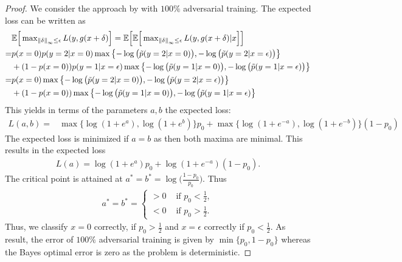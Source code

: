 \begin{proof}
    We consider the approach by \cite{MadryICLR2018} with $100\%$ adversarial training. The expected loss can be written as
	\begin{align*}
		&\mathbb{E}\Big[\mathop{\rm max}\nolimits_{\left\|\delta\right\|_\infty\leq \epsilon} L(y,g(x+\delta)\Big]= \mathbb{E}\Big[\mathbb{E}\Big[\mathop{\rm max}\nolimits_{\left\|\delta\right\|_\infty\leq \epsilon} L(y,g(x+\delta)|x\Big]\Big]\\
		=&p(x=0)p(y=2|x=0)\mathop{\rm max}\nolimits\left\{-\log\big(\tilde{p}(y=2|x=0)\big),-\log\big(\tilde{p}(y=2|x=\epsilon)\big)\right\}\\
		&+(1-p(x=0))p(y=1|x=\epsilon)\mathop{\rm max}\nolimits\left\{-\log\big(\tilde{p}(y=1|x=0)\big),-\log\big(\tilde{p}(y=1|x=\epsilon)\big)\right\}\\
		=&p(x=0)\mathop{\rm max}\nolimits\left\{-\log\big(\tilde{p}(y=2|x=0)\big),-\log\big(\tilde{p}(y=2|x=\epsilon)\big)\right\}\\
	 	&+ (1-p(x=0))\mathop{\rm max}\nolimits\left\{-\log\big(\tilde{p}(y=1|x=0)\big),-\log\big(\tilde{p}(y=1|x=\epsilon)\right\}
	\end{align*}
	This yields in terms of the parameters $a,b$ the expected loss:
    \begin{align*}
    	L(a,b)=&  \max\Big\{ \log(1+e^a),\log(1+e^b)\Big\}p_0 + \max\Big\{ \log(1+e^{-a}),\log(1+e^{-b})\Big\}(1-p_0)
    \end{align*}
   	The expected loss is minimized if $a=b$ as then both maxima are minimal. This results in the expected loss
   	\begin{align*}
    	L(a)= \log(1+e^a)p_0 + \log(1+e^{-a}) (1-p_0).
    \end{align*}
    The critical point is attained at $a^*=b^*=\log\Big(\frac{1-p_0}{p_0}\Big)$. 
    Thus
    \begin{align*}
        a^*=b^*=\begin{cases} >0 & \textrm{ if } p_0<\frac{1}{2},\\ <0 & \textrm{ if } p_0>\frac{1}{2}.\end{cases}
    \end{align*}
    Thus, we classify $x=0$ correctly, if $p_0>\frac{1}{2}$ and $x=\epsilon$ correctly if $p_0<\frac{1}{2}$. As result, the error of $100\%$ adversarial training is given by
    $\min\{p_0,1-p_0\}$ whereas the Bayes optimal error is zero as the problem is deterministic.
    

\end{proof}
